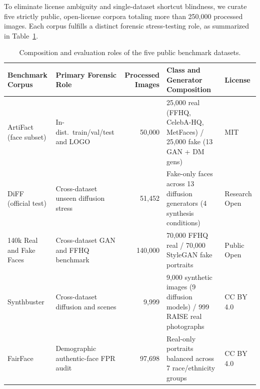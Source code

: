 \documentclass[final,5p,times,twocolumn,numafflabel]{elsarticle}
\begin{document}
To eliminate license ambiguity and single-dataset shortcut blindness, we curate five strictly public, open-license corpora totaling more than 250,000 processed images. Each corpus fulfills a distinct forensic stress-testing role, as summarized in Table~\ref{tab:datasets}.

\begin{table}[t]
\centering
\caption{Composition and evaluation roles of the five public benchmark datasets.}
\label{tab:datasets}
\footnotesize
\setlength{\tabcolsep}{5pt}
\renewcommand{\arraystretch}{1.15}
\begin{tabularx}{\textwidth}{@{}l l r X l@{}}
\toprule
\textbf{Benchmark Corpus} & \textbf{Primary Forensic Role} & \textbf{Processed Images} & \textbf{Class and Generator Composition} & \textbf{License} \\
\midrule
ArtiFact (face subset) & In-dist.\ train/val/test and LOGO & 50,000 & 25,000 real (FFHQ, CelebA-HQ, MetFaces) / 25,000 fake (13 GAN + DM gens) & MIT \\
DiFF (official test) \cite{Cheng_2024} & Cross-dataset unseen diffusion stress & 51,452 & Fake-only faces across 13 diffusion generators (4 synthesis conditions) & Research Open \\
140k Real and Fake Faces & Cross-dataset GAN and FFHQ benchmark & 140,000 & 70,000 FFHQ real / 70,000 StyleGAN fake portraits & Public Open \\
Synthbuster \cite{Bammey_2024} & Cross-dataset diffusion and scenes & 9,999 & 9,000 synthetic images (9 diffusion models) / 999 RAISE real photographs & CC BY 4.0 \\
FairFace & Demographic authentic-face FPR audit & 97,698 & Real-only portraits balanced across 7 race/ethnicity groups & CC BY 4.0 \\
\bottomrule
\end{tabularx}
\end{table}
\end{document}
